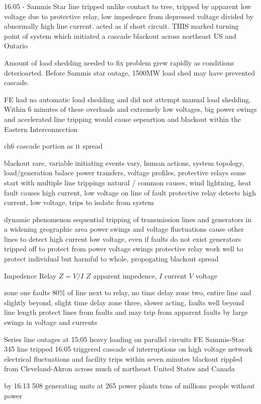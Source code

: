 16:05 - Sammis Star line tripped
unlike contact to tree, tripped by apparent low voltage due to protective relay, low impedence from depressed voltage divided by abnormally high line current.  acted as if short circuit. 
THIS marked turning point of system which initiated a cascade blackout across northeast US and Ontario

Amount of load shedding needed to fix problem grew rapidly as conditions deterioarted.
Before Sammis star outage, 1500MW load shed may have prevented cascade.

FE had no automatic load shedding and did not attempt manual load shedding.  Within 6 minutes of these overloads and extremely low voltages, big power swings and accelerated line tripping would cause sepeartion and blackout within the Eastern Interconnection

ch6 cascade portion as it spread

blackout rare, variable
initiating events vary, human actions, system topology, load/generation balace
power transfers, voltage profiles, protective relays
some start with multiple line trippings
natural / common causes, wind lightning, heat
fault causes high current, low voltage on line of fault
protective relay detects high current, low voltage, trips to isolate from system

dynamic phenomenon
sequential tripping of transmission lines and generators in a widening geographic area
power swings and voltage fluctuations cause other lines to detect high current low voltage, even if faults do not exist
generators tripped off to protect from power voltage swings
protective relay work well to protect individual
but harmful to whole, propogating blackout spread

Impedence Relay
$Z = V / I$ 
$Z$ apparent impedence,
$I$ current
$V$ voltage

zone one faults $80$\% of line next to relay, no time delay
zone two, entire line and slightly beyond, slight time delay
zone three, slower acting, faults well beyond line length
protect lines from faults and may trip from apparent faults by large swings in voltage and currents


Series line outages at 15:05
heavy loading on parallel circuits 
FE Sammis-Star 345 line tripped 16:05
triggered cascade of interruptions on high voltage network
electrical fluctuations and facility trips
within seven minutes blackout rippled from Cleveland-Akron across much of northeast United States and Canada

by 16:13
508 generating units at 265 power plants
tens of millions people without power

